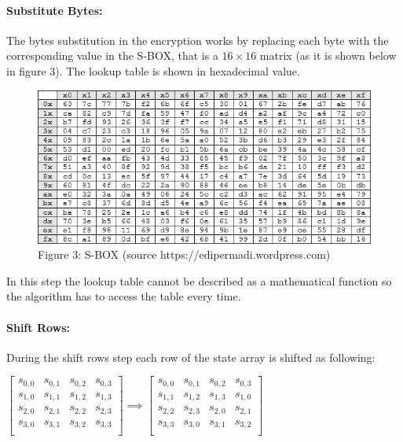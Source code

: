 \paragraph{Substitute Bytes: }
The bytes substitution in the encryption works by replacing each byte with the corresponding value in the S-BOX, that is a $16\times16$ matrix (as it is shown below in figure 3). The lookup table is shown in hexadecimal value.
\newpage
\begin{figure}[htbp]
\centering
\includegraphics[scale=0.7]{sbox.png}
\\Figure 3: S-BOX (source https://edipermadi.wordpress.com)
\end{figure}
In this step the lookup table cannot be described as a mathematical function so the algorithm has to access the table every time.\\


\paragraph{Shift Rows: }
During the shift rows step each row of the state array is shifted as following:\\
\begin{center}
$
\begin{bmatrix}
s_{0,0} & s_{0,1} & s_{0,2} & s_{0,3} \\ 
s_{1,0} & s_{1,1} & s_{1,2} & s_{1,3} \\
s_{2,0} & s_{2,1} & s_{2,2} & s_{2,3} \\
s_{3,0} & s_{3,1} & s_{3,2} & s_{3,3} \\
\end{bmatrix}
\implies
\begin{bmatrix}
s_{0,0} & s_{0,1} & s_{0,2} & s_{0,3} \\ 
s_{1,1} & s_{1,2} & s_{1,3} & s_{1,0}\\
s_{2,2} & s_{2,3} & s_{2,0} & s_{2,1} \\
s_{3,3} & s_{3,0} & s_{3,1} & s_{3,2} \\
\end{bmatrix}
$
\end{center}

